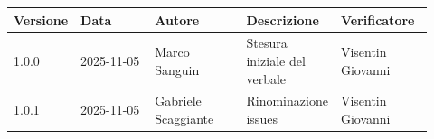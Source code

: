 \documentclass[a4paper,12pt]{article}
\begin{document}
	\begin{center}
		\small
		\renewcommand{\arraystretch}{1.2} 
		\begin{tabular}{|p{0.1\linewidth}|p{0.18\linewidth}|p{0.22\linewidth}|p{0.20\linewidth}|p{0.22\linewidth}|}
			\hline
			\rowcolor{gray!60} 
			\textbf{Versione} & \textbf{Data} & \textbf{Autore} & \textbf{Descrizione} & \textbf{Verificatore} \\
			\hline
			\rowcolor{white}
			1.0.0 & 2025-11-05 & Marco Sanguin  & Stesura iniziale del verbale & Visentin Giovanni \\
			\hline
			\rowcolor{gray!20} 
			1.0.1 & 2025-11-05 & Gabriele Scaggiante & Rinominazione issues & Visentin Giovanni \\
			\hline
	
		\end{tabular}
	\end{center}
	
\end{document}
